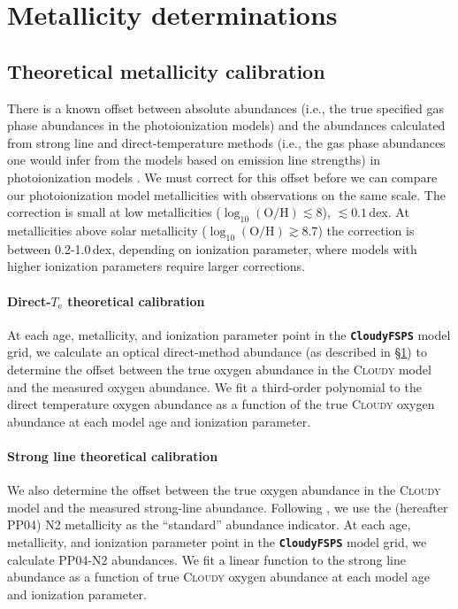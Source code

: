 \documentclass[preprint2]{aastex62}
\newcommand{\CloudyFSPS}{{\tt \textbf{CloudyFSPS}}\xspace}
\newcommand{\Cloudy}{\textsc{Cloudy}\xspace}
\newcommand{\logten}{\ensuremath{\log_{10}}}
\newcommand{\logOH}{\ensuremath{\logten (\mathrm{O}/\mathrm{H})}\xspace}
\newcommand{\Te}{\ensuremath{T_{\mathrm{e}}}\xspace}
\begin{document}
\section{Metallicity determinations}\label{sec:model:Te}

\subsection{Theoretical metallicity calibration}\label{sec:model:corr}

There is a known offset between absolute abundances (i.e., the true specified gas phase abundances in the photoionization models) and the abundances calculated from strong line and direct-temperature methods (i.e., the gas phase abundances one would infer from the models based on emission line strengths) in photoionization models \citep{Kewley+2008}. We must correct for this offset before we can compare our photoionization model metallicities with observations on the same scale. The correction is small at low metallicities (\logOH$ \lesssim 8$), $\lesssim 0.1$\,dex. At metallicities above solar metallicity (\logOH$\gtrsim 8.7$) the correction is between 0.2-1.0\,dex, depending on ionization parameter, where models with higher ionization parameters require larger corrections.

\paragraph{Direct-\Te theoretical calibration} At each age, metallicity, and ionization parameter point in the \CloudyFSPS model grid, we calculate an optical direct-method abundance (as described in \S\ref{sec:model:Te}) to determine the offset between the true oxygen abundance in the \Cloudy model and the measured oxygen abundance. We fit a third-order polynomial to the direct temperature oxygen abundance as a function of the true \Cloudy oxygen abundance at each model age and ionization parameter.

\paragraph{Strong line theoretical calibration} We also determine the offset between the true oxygen abundance in the \Cloudy model and the measured strong-line abundance. Following \citet{Kewley+2008}, we use the \citet{Pettini+2004} (hereafter PP04) N2 metallicity as the ``standard'' abundance indicator. At each age, metallicity, and ionization parameter point in the \CloudyFSPS model grid, we calculate PP04-N2 abundances. We fit a linear function to the strong line abundance as a function of true \Cloudy oxygen abundance at each model age and ionization parameter.
\end{document}
